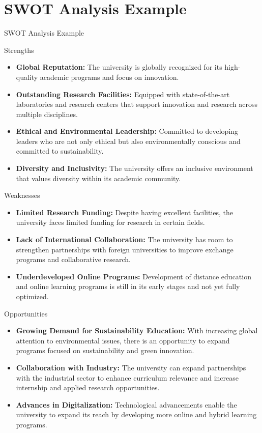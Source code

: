 \documentclass[aspectratio=169, table]{beamer}
\begin{document}
\section{SWOT Analysis Example}

\begin{frame}
	\centering
	\Huge SWOT Analysis Example
\end{frame}

\begin{frame}{Strengths}
	\begin{itemize}
		\item \textbf{Global Reputation:} The university is globally recognized for its high-quality academic programs and focus on innovation.
		\item \textbf{Outstanding Research Facilities:} Equipped with state-of-the-art laboratories and research centers that support innovation and research across multiple disciplines.
		\item \textbf{Ethical and Environmental Leadership:} Committed to developing leaders who are not only ethical but also environmentally conscious and committed to sustainability.
		\item \textbf{Diversity and Inclusivity:} The university offers an inclusive environment that values diversity within its academic community.
	\end{itemize}
\end{frame}

\begin{frame}{Weaknesses}
	\begin{itemize}
		\item \textbf{Limited Research Funding:} Despite having excellent facilities, the university faces limited funding for research in certain fields.
		\item \textbf{Lack of International Collaboration:} The university has room to strengthen partnerships with foreign universities to improve exchange programs and collaborative research.
		\item \textbf{Underdeveloped Online Programs:} Development of distance education and online learning programs is still in its early stages and not yet fully optimized.
	\end{itemize}
\end{frame}

\begin{frame}{Opportunities}
	\begin{itemize}
		\item \textbf{Growing Demand for Sustainability Education:} With increasing global attention to environmental issues, there is an opportunity to expand programs focused on sustainability and green innovation.
		\item \textbf{Collaboration with Industry:} The university can expand partnerships with the industrial sector to enhance curriculum relevance and increase internship and applied research opportunities.
		\item \textbf{Advances in Digitalization:} Technological advancements enable the university to expand its reach by developing more online and hybrid learning programs.
	\end{itemize}
\end{frame}
\end{document}
